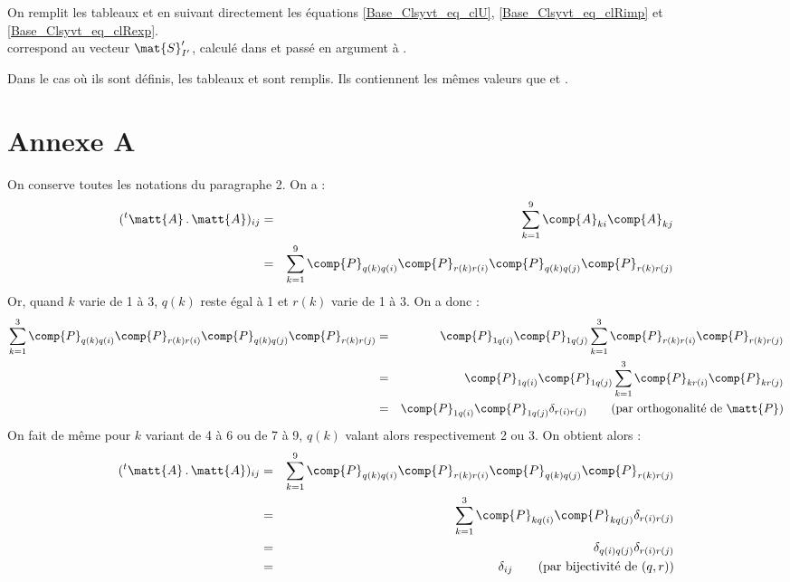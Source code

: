 On remplit les tableaux  et  en suivant directement les
\'equations \ref{Base_Clsyvt_eq_clU}, \ref{Base_Clsyvt_eq_clRimp} et \ref{Base_Clsyvt_eq_clRexp}.\\
 correspond au vecteur $\mat{S}_{I'}^\prime$, calcul\'e dans
 et pass\'e en argument \`a .

Dans le cas o\`u ils sont d\'efinis, les tableaux  et 
sont remplis. Ils contiennent les m\^emes valeurs que  et
.


\section{Annexe A}

On conserve toutes les notations du paragraphe 2. On a :
\begin{eqnarray}
(^t\matt{A}\,.\,\matt{A})_{ij}
& = & \sum_{k=1}^9\comp{A}_{ki}\comp{A}_{kj}\nonumber\\
& = & \sum_{k=1}^9
\comp{P}_{q(k)q(i)}\comp{P}_{r(k)r(i)}\comp{P}_{q(k)q(j)}\comp{P}_{r(k)r(j)}
\end{eqnarray}
Or, quand $k$ varie de 1 \`a 3, $q(k)$ reste \'egal \`a 1 et $r(k)$ varie de 1
\`a 3. On a donc :
\begin{eqnarray}
\sum_{k=1}^3
\comp{P}_{q(k)q(i)}\comp{P}_{r(k)r(i)}\comp{P}_{q(k)q(j)}\comp{P}_{r(k)r(j)}
&=&\comp{P}_{1q(i)}\comp{P}_{1q(j)}\sum_{k=1}^3
\comp{P}_{r(k)r(i)}\comp{P}_{r(k)r(j)}\nonumber\\
&=&\comp{P}_{1q(i)}\comp{P}_{1q(j)}\sum_{k=1}^3
\comp{P}_{kr(i)}\comp{P}_{kr(j)}\\
&=&\comp{P}_{1q(i)}\comp{P}_{1q(j)}\delta_{r(i)r(j)}\qquad\text{(par
orthogonalit\'e de $\matt{P}$)}\nonumber
\end{eqnarray}
On fait de m\^eme pour $k$ variant de 4 \`a 6 ou de 7 \`a 9, $q(k)$ valant alors
respectivement 2 ou 3. On obtient alors :
\begin{eqnarray}
(^t\matt{A}\,.\,\matt{A})_{ij}
&=&
\sum_{k=1}^9
\comp{P}_{q(k)q(i)}\comp{P}_{r(k)r(i)}\comp{P}_{q(k)q(j)}\comp{P}_{r(k)r(j)}
\nonumber\\
&=&
\sum_{k=1}^3\comp{P}_{kq(i)}\comp{P}_{kq(j)}\delta_{r(i)r(j)}\\
&=&\delta_{q(i)q(j)}\delta_{r(i)r(j)}\nonumber\\
&=&\delta_{ij}\qquad
\text{(par bijectivit\'e de $(q,r)$)}\nonumber
\end{eqnarray}


